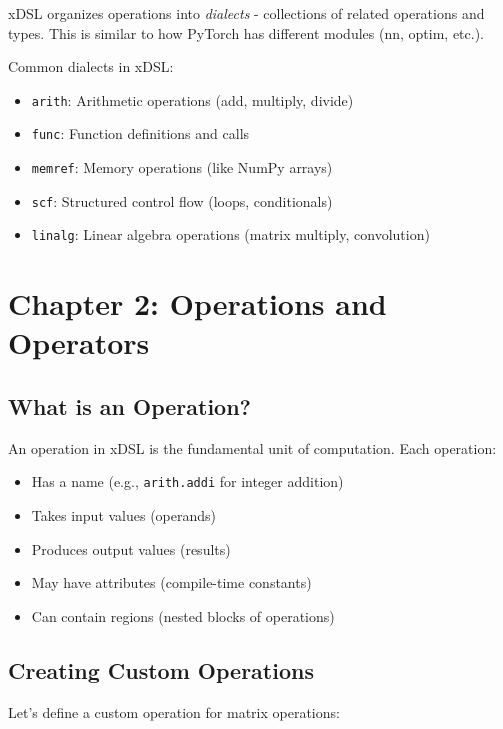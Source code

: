 \documentclass[11pt,a4paper]{article}
\begin{document}
xDSL organizes operations into \textit{dialects} - collections of related operations and types. This is similar to how PyTorch has different modules (nn, optim, etc.).

Common dialects in xDSL:
\begin{itemize}
    \item \texttt{arith}: Arithmetic operations (add, multiply, divide)
    \item \texttt{func}: Function definitions and calls
    \item \texttt{memref}: Memory operations (like NumPy arrays)
    \item \texttt{scf}: Structured control flow (loops, conditionals)
    \item \texttt{linalg}: Linear algebra operations (matrix multiply, convolution)
\end{itemize}

\section{Chapter 2: Operations and Operators}

\subsection{What is an Operation?}

An operation in xDSL is the fundamental unit of computation. Each operation:
\begin{itemize}
    \item Has a name (e.g., \texttt{arith.addi} for integer addition)
    \item Takes input values (operands)
    \item Produces output values (results)
    \item May have attributes (compile-time constants)
    \item Can contain regions (nested blocks of operations)
\end{itemize}

\subsection{Creating Custom Operations}

Let's define a custom operation for matrix operations:
\end{document}
